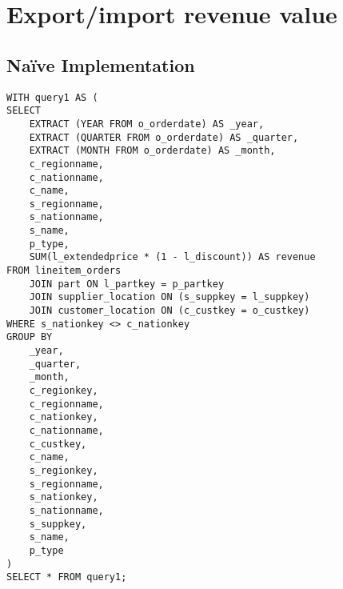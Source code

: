

\section{Export/import revenue value}

\subsection{Na\"{i}ve Implementation}

\begin{lstlisting}
WITH query1 AS (
SELECT
	EXTRACT (YEAR FROM o_orderdate) AS _year,
	EXTRACT (QUARTER FROM o_orderdate) AS _quarter,
	EXTRACT (MONTH FROM o_orderdate) AS _month,
	c_regionname,
	c_nationname,
	c_name,
	s_regionname,
	s_nationname,
	s_name,
	p_type,
	SUM(l_extendedprice * (1 - l_discount)) AS revenue
FROM lineitem_orders 
	JOIN part ON l_partkey = p_partkey
	JOIN supplier_location ON (s_suppkey = l_suppkey)
	JOIN customer_location ON (c_custkey = o_custkey)
WHERE s_nationkey <> c_nationkey
GROUP BY
	_year,
	_quarter,
	_month,
	c_regionkey,
	c_regionname,
	c_nationkey,
	c_nationname,
	c_custkey,
	c_name,
	s_regionkey,
	s_regionname,
	s_nationkey,
	s_nationname,
	s_suppkey,
	s_name,
	p_type
) 
SELECT * FROM query1;
\end{lstlisting}